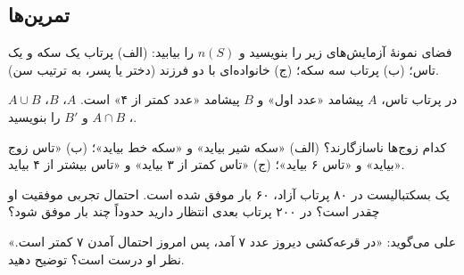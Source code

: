 \subsection*{تمرین‌ها}

\begin{exercise}
فضای نمونهٔ آزمایش‌های زیر را بنویسید و $n(S)$ را بیابید: (الف) پرتاب یک سکه و یک تاس؛ (ب) پرتاب سه سکه؛ (ج) خانواده‌ای با دو فرزند (دختر یا پسر، به ترتیب سن).
\end{exercise}

\begin{exercise}
در پرتاب تاس، $A$ پیشامد «عدد اول» و $B$ پیشامد «عدد کمتر از ۴» است. $A$، $B$، $A\cup B$، $A\cap B$ و $B'$ را بنویسید.
\end{exercise}

\begin{exercise}
کدام زوج‌ها ناسازگارند؟ (الف) «سکه شیر بیاید» و «سکه خط بیاید»؛ (ب) «تاس زوج بیاید» و «تاس ۶ بیاید»؛ (ج) «تاس کمتر از ۳ بیاید» و «تاس بیشتر از ۴ بیاید».
\end{exercise}

\begin{exercise}
یک بسکتبالیست در ۸۰ پرتاب آزاد، ۶۰ بار موفق شده است. احتمال تجربی موفقیت او چقدر است؟ در ۲۰۰ پرتاب بعدی انتظار دارید حدوداً چند بار موفق شود؟
\end{exercise}

\begin{exercise}
علی می‌گوید: «در قرعه‌کشی دیروز عدد ۷ آمد، پس امروز احتمال آمدن ۷ کمتر است.» نظر او درست است؟ توضیح دهید.
\end{exercise}
